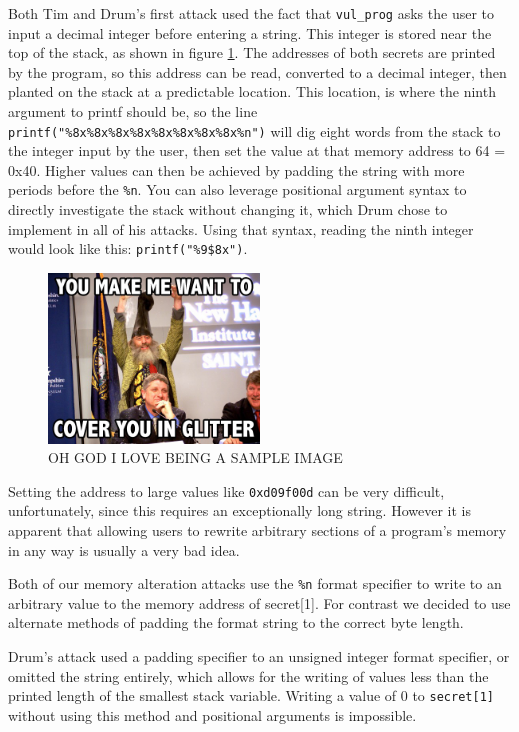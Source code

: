 Both Tim and Drum's first attack used the fact that {\tt vul\_prog} asks the user to input a decimal integer before
entering a string. This integer is stored near the top of the stack, as shown in figure \ref{fig_vul_prog_stack}. The
addresses of both secrets are printed by the program, so this address can be read, converted to a decimal integer, then
planted on the stack at a predictable location. This location, is where the ninth argument to printf should be, so the
line {\tt printf("\%8x\%8x\%8x\%8x\%8x\%8x\%8x\%8x\%n")} will dig eight words from the stack to the integer input by the
user, then set the value at that memory address to 64 = 0x40. Higher values can then be achieved by padding the string
with more periods before the {\tt \%n}. You can also leverage positional argument syntax to directly investigate the
stack without changing it, which Drum chose to implement in all of his attacks. Using that syntax, reading the ninth
integer would look like this: {\tt printf("\%9\$8x")}.

\begin{figure}[ht]
	\centering
	\includegraphics[width = 0.5\textwidth]{./images/placeholder.jpg}
	\caption{OH GOD I LOVE BEING A SAMPLE IMAGE}
	\label{fig_vul_prog_stack}
\end{figure}

Setting the address to large values like {\tt 0xd09f00d} can be very difficult, unfortunately, since this requires an
exceptionally long string. However it is apparent that allowing users to rewrite arbitrary sections of a program's
memory in any way is usually a very bad idea.

Both of our memory alteration attacks use the {\tt \%n} format specifier to write to an arbitrary value to the memory
address of secret[1]. For contrast we decided to use alternate methods of padding the format string to the correct byte
length.

Drum's attack used a padding specifier to an unsigned integer format specifier, or omitted the string entirely,
which allows for the writing of values less than the printed length of the smallest stack variable. Writing a value of
0 to {\tt secret[1]} without using this method and positional arguments is impossible.

